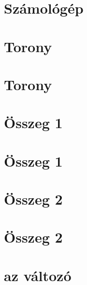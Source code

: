 \begin{spacing}{1.2}
\section*{Számológép} \label{DBmatlabia1}
\Desc{

}
\vspace{0.5cm}
\newpage
\section*{Torony} \label{DBmatlabia1s}
\Fa{

}
\vspace{0.5cm}
\newpage
\section*{Torony} \label{DBmatlabia1sMo}
\Mo{

}
\vspace{0.5cm}
\newpage
\section*{Összeg 1} \label{DBmatlabia2}
\Fa{

}
\vspace{0.5cm}
\newpage
\section*{Összeg 1} \label{DBmatlabia2Mo}
\Mo{

}
\vspace{0.5cm}
\newpage
\section*{Összeg 2} \label{DBmatlabia3}
\Fa{

}
\vspace{0.5cm}
\newpage
\section*{Összeg 2} \label{DBmatlabia3Mo}
\Mo{

}
\vspace{0.5cm}
\newpage
\section*{az  változó} \label{DBmatlabia4}
\Desc{

}
\vspace{0.5cm}
\newpage

\end{spacing}
